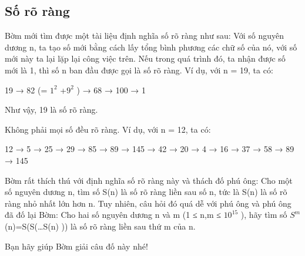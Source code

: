 \subsection{   Số rõ ràng  }

   Bờm mới tìm được một tài liệu định nghĩa số rõ ràng như sau: Với số nguyên dương n, ta tạo số mới bằng cách lấy tổng bình phương các chữ số của nó, với số mới này ta lại lặp lại công việc trên. Nếu trong quá trình đó, ta nhận được số mới là 1, thì số n ban đầu được gọi là số rõ ràng. Ví dụ, với n = 19, ta có:  

   19 → 82 (= $1^{2}$   +$9^{2}$   ) → 68 → 100 → 1  

   Như vậy, 19 là số rõ ràng.  

   Không phải mọi số đều rõ ràng. Ví dụ, với n = 12, ta có:  

   12 → 5 → 25 → 29 → 85 → 89 → 145 → 42 → 20 → 4 → 16 → 37 → 58 → 89 → 145  

   Bờm rất thích thú với định nghĩa số rõ ràng này và thách đố phú ông: Cho một số nguyên dương n, tìm số S(n) là số rõ ràng liền sau số n, tức là S(n) là số rõ ràng nhỏ nhất lớn hơn n. Tuy nhiên, câu hỏi đó quá dễ với phú ông và phú ông đã đố lại Bờm: Cho hai số nguyên dương n và m (1 ≤ n,m ≤ $10^{15}$   ), hãy tìm số $S^{m}$   (n)=S(S(…S(n) )) là số rõ ràng liền sau thứ m của n.  

   Bạn hãy giúp Bờm giải câu đố này nhé!